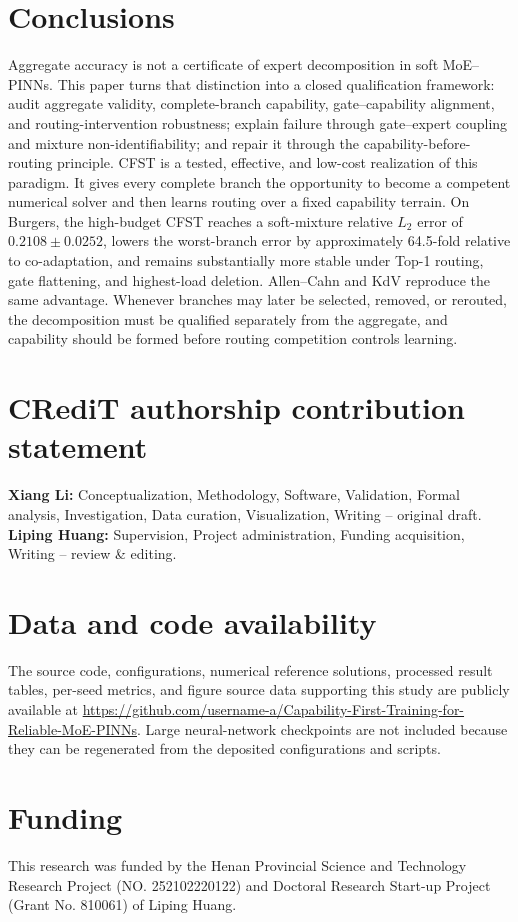 \documentclass[preprint,12pt]{elsarticle}
\theoremstyle{remark}
\begin{document}
\section{Conclusions}
Aggregate accuracy is not a certificate of expert decomposition in soft MoE--PINNs. This paper turns that distinction into a closed qualification framework: audit aggregate validity, complete-branch capability, gate--capability alignment, and routing-intervention robustness; explain failure through gate--expert coupling and mixture non-identifiability; and repair it through the capability-before-routing principle. CFST is a tested, effective, and low-cost realization of this paradigm. It gives every complete branch the opportunity to become a competent numerical solver and then learns routing over a fixed capability terrain. On Burgers, the high-budget CFST reaches a soft-mixture relative $L_2$ error of $0.2108\pm0.0252$, lowers the worst-branch error by approximately 64.5-fold relative to co-adaptation, and remains substantially more stable under Top-1 routing, gate flattening, and highest-load deletion. Allen--Cahn and KdV reproduce the same advantage. Whenever branches may later be selected, removed, or rerouted, the decomposition must be qualified separately from the aggregate, and capability should be formed before routing competition controls learning.

\section*{CRediT authorship contribution statement}
\textbf{Xiang Li:} Conceptualization, Methodology, Software, Validation, Formal analysis, Investigation, Data curation, Visualization, Writing -- original draft.
\textbf{Liping Huang:} Supervision, Project administration, Funding acquisition, Writing -- review \& editing.

\section*{Data and code availability}
The source code, configurations, numerical reference solutions, processed result tables, per-seed metrics, and figure source data supporting this study are publicly available at \url{https://github.com/username-a/Capability-First-Training-for-Reliable-MoE-PINNs}. Large neural-network checkpoints are not included because they can be regenerated from the deposited configurations and scripts.

\section*{Funding}
This research was funded by the Henan Provincial Science and Technology Research Project (NO. 252102220122) and Doctoral Research Start-up Project (Grant No. 810061) of Liping Huang.
\end{document}

